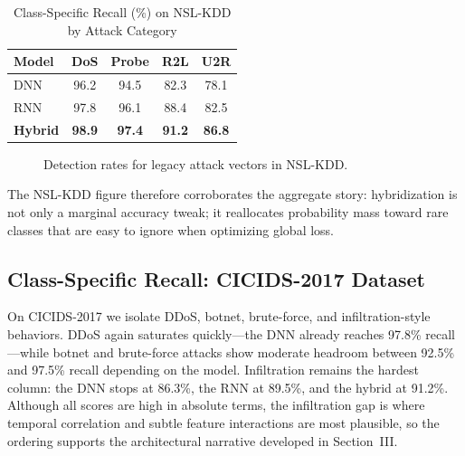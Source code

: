 \documentclass[10pt, conference, compsocconf, letterpaper, twocolumn, twoside]{IEEEtran}
\begin{document}
\begin{table}[h]
\centering
\caption{Class-Specific Recall (\%) on NSL-KDD by Attack Category}
\label{table:nsl_class_recall}
\begin{tabular}{|l|c|c|c|c|}
\hline
\textbf{Model} & \textbf{DoS} & \textbf{Probe} & \textbf{R2L} & \textbf{U2R} \\ \hline
DNN & 96.2 & 94.5 & 82.3 & 78.1 \\
RNN & 97.8 & 96.1 & 88.4 & 82.5 \\
\textbf{Hybrid} & \textbf{98.9} & \textbf{97.4} & \textbf{91.2} & \textbf{86.8} \\ \hline
\end{tabular}
\end{table}

\begin{figure}[h]
\centering
{}
\caption{Detection rates for legacy attack vectors in NSL-KDD.}
\end{figure}

The NSL-KDD figure therefore corroborates the aggregate story: hybridization is not only a marginal accuracy tweak; it reallocates probability mass toward rare classes that are easy to ignore when optimizing global loss.

\subsection{Class-Specific Recall: CICIDS-2017 Dataset}
On CICIDS-2017 we isolate DDoS, botnet, brute-force, and infiltration-style behaviors. DDoS again saturates quickly---the DNN already reaches 97.8\% recall---while botnet and brute-force attacks show moderate headroom between 92.5\% and 97.5\% recall depending on the model. Infiltration remains the hardest column: the DNN stops at 86.3\%, the RNN at 89.5\%, and the hybrid at 91.2\%. Although all scores are high in absolute terms, the infiltration gap is where temporal correlation and subtle feature interactions are most plausible, so the ordering supports the architectural narrative developed in Section~III.
\end{document}
